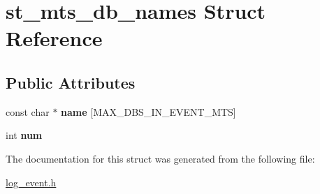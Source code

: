 \hypertarget{structst__mts__db__names}{}\section{st\+\_\+mts\+\_\+db\+\_\+names Struct Reference}
\label{structst__mts__db__names}
\subsection*{Public Attributes}
\begin{DoxyCompactItemize}
\item 
\mbox{\label{structst__mts__db__names_a28ce3572d37dd8bdaa823e2616c5e262}} 
const char $\ast$ {\bfseries name} \mbox{[}M\+A\+X\+\_\+\+D\+B\+S\+\_\+\+I\+N\+\_\+\+E\+V\+E\+N\+T\+\_\+\+M\+TS\mbox{]}
\item 
\mbox{\label{structst__mts__db__names_a96a5426c87aed54bd2650749525349b6}} 
int {\bfseries num}
\end{DoxyCompactItemize}


The documentation for this struct was generated from the following file\+:\begin{DoxyCompactItemize}
\item 
\mbox{\hyperlink{log__event_8h}{log\+\_\+event.\+h}}\end{DoxyCompactItemize}
